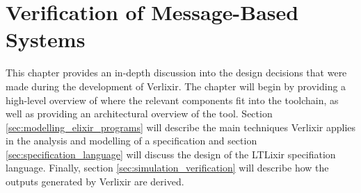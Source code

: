 \chapter{Verification of Message-Based Systems} \label{chap:design}
This chapter provides an in-depth discussion into the design decisions that were made during the development of Verlixir. The chapter will begin by providing a high-level overview of where the relevant components fit into the toolchain, as well as providing an architectural overview of the tool. Section \ref{sec:modelling_elixir_programs} will describe the main techniques Verlixir applies in the analysis and modelling of a specification and section \ref{sec:specification_language} will discuss the design of the LTLixir specifiation language. Finally, section \ref{sec:simulation_verification} will describe how the outputs generated by Verlixir are derived.  
